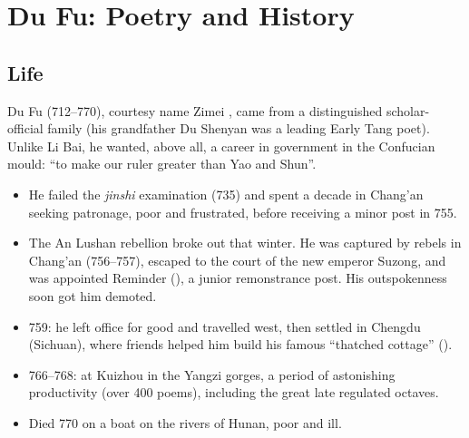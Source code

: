 \chapter{Du Fu: Poetry and History}

\section{Life}

Du Fu  (712--770), courtesy name Zimei , came from a distinguished
scholar-official family (his grandfather Du Shenyan was a leading Early Tang poet). Unlike
Li Bai, he wanted, above all, a career in government in the Confucian mould: ``to make our
ruler greater than Yao and Shun''.

\begin{itemize}
  \item He failed the \emph{jinshi} examination (735) and spent a decade in Chang'an
        seeking patronage, poor and frustrated, before receiving a minor post in 755.
  \item The An Lushan rebellion broke out that winter. He was captured by rebels in
        Chang'an (756--757), escaped to the court of the new emperor Suzong, and was
        appointed Reminder (), a junior remonstrance post. His outspokenness
        soon got him demoted.
  \item 759: he left office for good and travelled west, then settled in Chengdu
        (Sichuan), where friends helped him build his famous ``thatched cottage''
        ().
  \item 766--768: at Kuizhou in the Yangzi gorges, a period of astonishing productivity
        (over 400 poems), including the great late regulated octaves.
  \item Died 770 on a boat on the rivers of Hunan, poor and ill.
\end{itemize}

